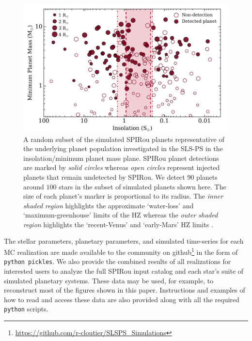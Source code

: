 \begin{figure}
  \centering
  \includegraphics[width=0.8\hsize]{figures/SPIRoudet_Fmpsini.png}%
  \caption[One realization of targetted and detected planets in the SLS-PS versus insolation and ]
      {\small A random subset of the simulated SPIRou planets representative of the underlying planet
    population investigated in the SLS-PS in the insolation/minimum planet mass plane.
    SPIRou planet detections are marked by
    \emph{solid circles} whereas \emph{open circles} represent injected planets that remain undetected by SPIRou.
    We detect 90 planets around $100$ stars in the subset of simulated planets shown here.
    The size of each planet's marker is proportional to its radius. The \emph{inner shaded region} highlights
    the approximate `water-loss' and `maximum-greenhouse' limits of the HZ whereas the
    \emph{outer shaded region} highlights the `recent-Venus' and `early-Mars' HZ limits \citep{kopparapu13}.}
  \label{BSfig:spiroudet}
\end{figure}


The stellar parameters, planetary parameters, and simulated time-series for each MC realization are made
available to the community on
github\footnote{\href{https://github.com/r-cloutier/SLSPS\_Simulations}{https://github.com/r-cloutier/SLSPS\_Simulations}}
in the form of \texttt{python pickles}.
We also provide the combined results of all realizations for interested users to analyze the full SPIRou
input catalog and each star's suite of simulated planetary systems. These data may be used, for example,
to reconstruct most of the figures shown in this paper. Instructions and examples of how to read and
access these data are also provided along with all the required \texttt{python} scripts. \\


